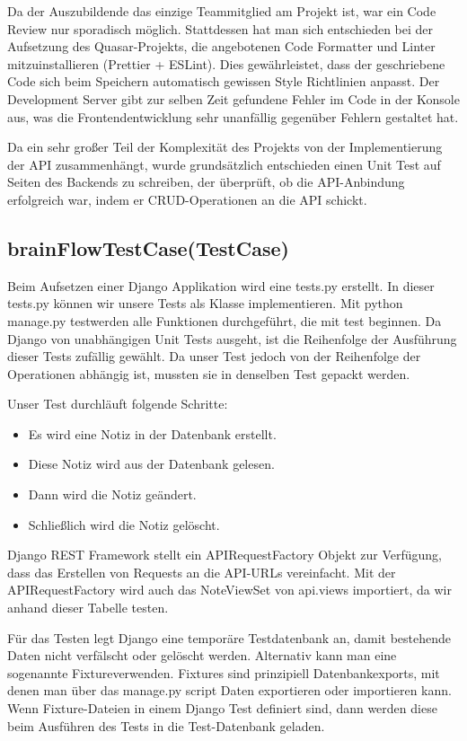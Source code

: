 Da der Auszubildende das einzige Teammitglied am Projekt ist, war ein Code Review nur sporadisch möglich. Stattdessen hat man sich entschieden bei der Aufsetzung
des Quasar-Projekts, die angebotenen Code Formatter und Linter mitzuinstallieren (Prettier + ESLint). Dies gewährleistet, dass der geschriebene Code sich beim
Speichern automatisch gewissen Style Richtlinien anpasst. Der Development Server gibt zur selben Zeit gefundene Fehler im Code in der Konsole aus, was die
Frontendentwicklung sehr unanfällig gegenüber Fehlern gestaltet hat.

\bigskip\noindent
Da ein sehr großer Teil der Komplexität des Projekts von der Implementierung der API zusammenhängt, wurde grundsätzlich entschieden einen Unit Test
auf Seiten des Backends zu schreiben, der überprüft, ob die API-Anbindung erfolgreich war, indem er CRUD-Operationen an die API schickt.

\subsection*{brainFlowTestCase(TestCase)}
Beim Aufsetzen einer Django Applikation wird eine tests.py erstellt.
In dieser tests.py können wir unsere Tests als Klasse implementieren. Mit \flqq python manage.py test\frqq werden alle Funktionen durchgeführt, die mit \flqq test \frqq beginnen.
Da Django von unabhängigen Unit Tests ausgeht, ist die Reihenfolge der Ausführung dieser Tests zufällig gewählt. Da unser Test jedoch von der Reihenfolge der Operationen
abhängig ist, mussten sie in denselben Test gepackt werden.

\bigskip\noindent
Unser Test durchläuft folgende Schritte:
    \begin{itemize}
        \item Es wird eine Notiz in der Datenbank erstellt.
        \item Diese Notiz wird aus der Datenbank gelesen.
        \item Dann wird die Notiz geändert.
        \item Schließlich wird die Notiz gelöscht.
    \end{itemize}

\bigskip\noindent
Django REST Framework stellt ein APIRequestFactory Objekt zur Verfügung, dass das Erstellen von Requests an die API-URLs vereinfacht.
Mit der APIRequestFactory wird auch das NoteViewSet von api.views importiert, da wir anhand dieser Tabelle testen.

\bigskip\noindent
Für das Testen legt Django eine temporäre Testdatenbank an, damit bestehende Daten nicht verfälscht oder gelöscht werden. Alternativ kann man eine
sogenannte \flqq Fixture\frqq verwenden. Fixtures sind prinzipiell Datenbankexports, mit denen man über das manage.py script Daten exportieren oder
importieren kann. Wenn Fixture-Dateien in einem Django Test definiert sind, dann werden diese beim Ausführen des Tests in die Test-Datenbank geladen.